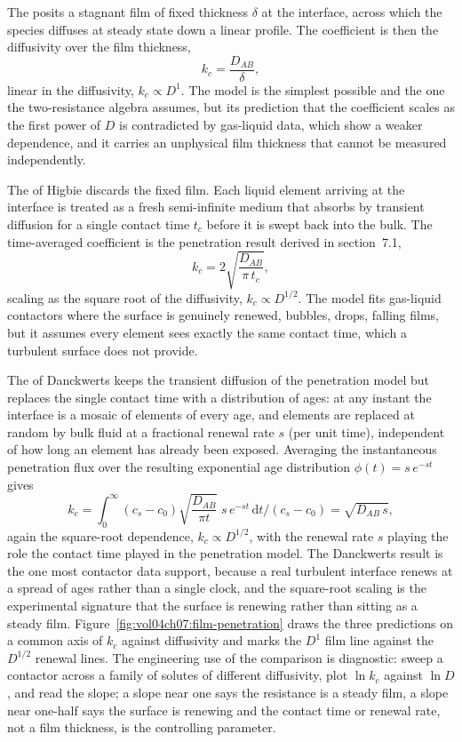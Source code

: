 The  posits a stagnant film of fixed thickness
$\delta$ at the interface, across which the species diffuses at steady
state down a linear profile. The coefficient is then the diffusivity over
the film thickness,
\[
k_c = \frac{D_{AB}}{\delta},
\]
linear in the diffusivity, $k_c \propto D^{1}$. The model is the simplest
possible and the one the two-resistance algebra assumes, but its
prediction that the coefficient scales as the first power of $D$ is
contradicted by gas-liquid data, which show a weaker dependence, and it
carries an unphysical film thickness that cannot be measured
independently.

The  of Higbie discards the fixed film. Each
liquid element arriving at the interface is treated as a fresh
semi-infinite medium that absorbs by transient diffusion for a single
contact time $t_c$ before it is swept back into the bulk. The
time-averaged coefficient is the penetration result derived in
section~7.1,
\[
k_c = 2\sqrt{\frac{D_{AB}}{\pi\,t_c}},
\]
scaling as the square root of the diffusivity, $k_c \propto D^{1/2}$. The
model fits gas-liquid contactors where the surface is genuinely renewed,
bubbles, drops, falling films, but it assumes every element sees exactly
the same contact time, which a turbulent surface does not provide.

The  of Danckwerts keeps the transient
diffusion of the penetration model but replaces the single contact time
with a distribution of ages: at any instant the interface is a mosaic of
elements of every age, and elements are replaced at random by bulk fluid
at a fractional renewal rate $s$ (per unit time), independent of how long
an element has already been exposed. Averaging the instantaneous
penetration flux over the resulting exponential age distribution
$\phi(t) = s\,e^{-st}$ gives
\[
k_c = \int_0^\infty (c_s - c_0)\sqrt{\frac{D_{AB}}{\pi t}}\;s\,e^{-st}\,
\mathrm{d}t \Big/ (c_s - c_0) = \sqrt{D_{AB}\,s},
\]
again the square-root dependence, $k_c \propto D^{1/2}$, with the renewal
rate $s$ playing the role the contact time played in the penetration
model. The Danckwerts result is the one most contactor data support,
because a real turbulent interface renews at a spread of ages rather than
a single clock, and the square-root scaling is the experimental
signature that the surface is renewing rather than sitting as a steady
film. Figure~\ref{fig:vol04ch07:film-penetration} draws the three
predictions on a common axis of $k_c$ against diffusivity and marks the
$D^{1}$ film line against the $D^{1/2}$ renewal lines. The engineering use
of the comparison is diagnostic: sweep a contactor across a family of
solutes of different diffusivity, plot $\ln k_c$ against $\ln D$, and read
the slope; a slope near one says the resistance is a steady film, a slope
near one-half says the surface is renewing and the contact time or
renewal rate, not a film thickness, is the controlling parameter.

